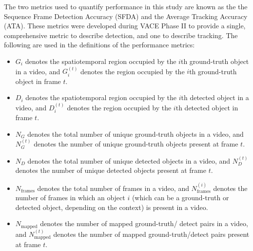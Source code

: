 \documentclass[twocolumn, final]{svjour3}
\begin{document}
The two metrics used to quantify performance in this study are known as the the Sequence Frame Detection Accuracy (SFDA) and the Average Tracking Accuracy (ATA). These metrics were developed during VACE Phase II to provide a single, comprehensive metric to describe detection, and one to describe tracking. The following are used in the definitions of the performance metrics:
\begin{itemize}
\renewcommand{\labelitemi}{$\bullet$}
\item $G_{i}$ denotes the spatiotemporal region occupied by the $i$th ground-truth object in a video, and $G_{i}^{(t)}$ denotes the region occupied by the $i$th ground-truth object in frame $t$.
\vspace{2mm}
\item $D_{i}$ denotes the spatiotemporal region occupied by the $i$th detected object in a video, and $D_{i}^{(t)}$ denotes the region occupied by the $i$th detected object in frame $t$.
\vspace{2mm}
\item $N_{G}$ denotes the total number of unique ground-truth objects in a video, and $N_{G}^{(t)}$ denotes the number of unique ground-truth objects present at frame $t$.
\vspace{2mm}
\item $N_{D}$ denotes the total number of unique detected objects in a video, and $N_{D}^{(t)}$ denotes the number of unique detected objects present at frame $t$.
\vspace{2mm}
\item $N_{\text{frames}}$ denotes the total number of frames in a video, and $N_{\text{frames}}^{(i)}$ denotes the number of frames in which an object $i$ (which can be a ground-truth or detected object, depending on the context) is present in a video.
\vspace{2mm}
\item $N_{\text{mapped}}$ denotes the number of mapped ground-truth/ detect pairs in a video, and $N_{\text{mapped}}^{(t)}$ denotes the number of mapped ground-truth/detect pairs present at frame $t$.
\vspace{1mm}
\end{itemize}
\end{document}
